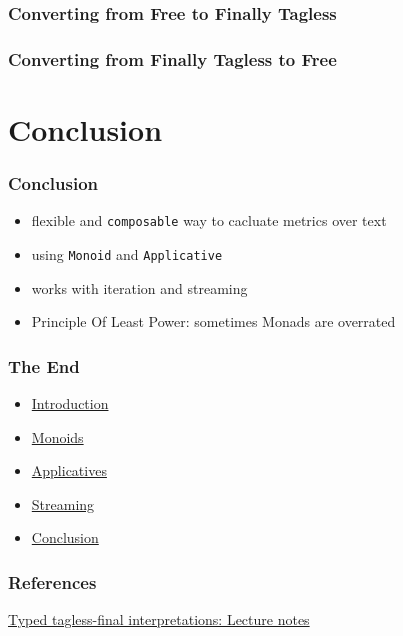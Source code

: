 \documentclass[aspectratio=169, hyperref={colorlinks, linkcolor=beamer@centricgreen}, urlcolor=links]{beamer}
\begin{document}
\begin{frame}
  \frametitle{Converting from Free to Finally Tagless}
\end{frame}

\begin{frame}
  \frametitle{Converting from Finally Tagless to Free}
\end{frame}

\section{Conclusion}\label{sec:conclusion}

\begin{frame}
  \frametitle{Conclusion}
  \begin{itemize}
  \item flexible and \texttt{composable} way to cacluate metrics over text
  \item using \texttt{Monoid} and \texttt{Applicative}
  \item works with iteration and streaming
  \item Principle Of Least Power: sometimes Monads are overrated
  \end{itemize}
\end{frame}

\begin{frame}
  \frametitle{The End}
  \begin{itemize}
  \item \hyperref[sec:introduction]{Introduction}
  \item \hyperref[sec:monoids]{Monoids}
  \item \hyperref[sec:applicatives]{Applicatives}
  \item \hyperref[sec:streaming]{Streaming}
  \item \hyperref[sec:conclusion]{Conclusion}
  \end{itemize}
  \vfill
\end{frame}

\begin{frame}
  \frametitle{References}
  \begin{center}
    \href{http://okmij.org/ftp/tagless-final/course/index.html}{Typed tagless-final interpretations: Lecture notes}
  \end{center}
\end{frame}

\appendix{}
\end{document}
